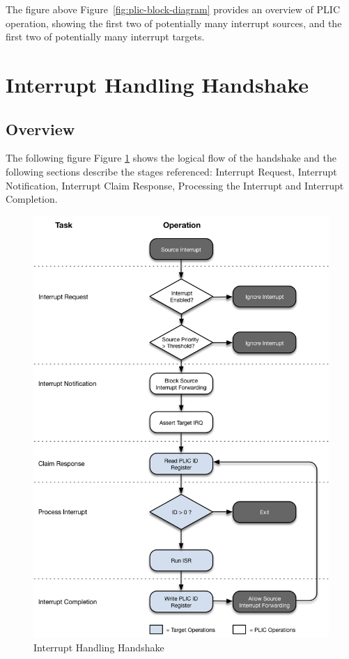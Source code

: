 \ifdefined\MARKDOWN
The figure above
\else
Figure~\ref{fig:plic-block-diagram} 
\fi
 provides an overview of PLIC operation, showing the first two of potentially many interrupt sources, and the first two of potentially many interrupt targets. 

\section{Interrupt Handling Handshake}

\subsection{Overview}

\ifdefined\MARKDOWN
The following figure
\else
Figure \ref{fig:HANDSHAKE} 
\fi
shows the logical flow of the handshake and the following sections describe the stages referenced: Interrupt Request, Interrupt Notification, Interrupt Claim Response, Processing the Interrupt and Interrupt Completion.

\begin{figure}[!htb]

\includegraphics{assets/img/plic-handshake}
\caption{Interrupt Handling Handshake}
\label{fig:HANDSHAKE}
\end{figure}

